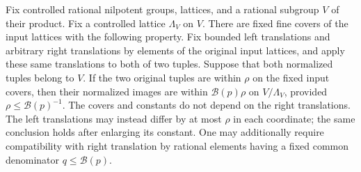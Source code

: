 \begin{lemma}
\label{shift:uniform-cover}
Fix controlled rational nilpotent groups, lattices, and a rational
subgroup $V$ of their product.  Fix a controlled lattice $\Lambda_V$
on $V$.  There are fixed fine covers of the input lattices with
the following property.  Fix bounded left translations and arbitrary
right translations by elements of the original input lattices, and
apply these same translations to both of two tuples.  Suppose that
both normalized tuples belong to $V$.  If the two original
tuples are within $\rho$ on the fixed input covers, then their
normalized images are within $\mathcal B(p)\rho$ on
$V/\Lambda_V$, provided $\rho\leq\mathcal B(p)^{-1}$.
The covers and constants do not depend on the right translations.
The left translations may instead differ by at most $\rho$ in each
coordinate; the same conclusion holds after enlarging its constant.
One may additionally require compatibility with right translation
by rational elements having a fixed common denominator
$q\leq\mathcal B(p)$.
\end{lemma}
